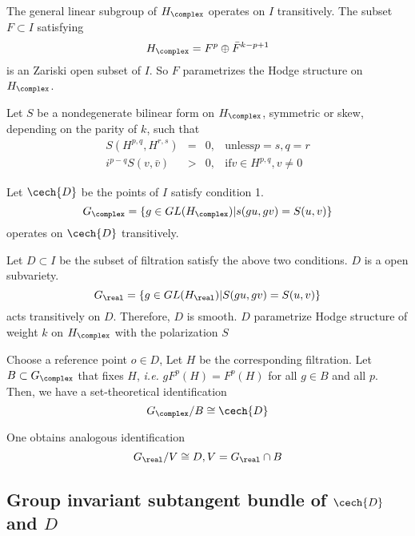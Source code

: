 \documentclass{article}
\begin{document}
The general linear subgroup of $H_{\complex}$ operates on $I$ transitively. 
The subset $F \subset I$ satisfying
\[
    H_{\complex} = F^p\oplus \bar{F}^{k-p+1}
\]
is an Zariski open subset of $I$. So $F$ parametrizes the Hodge structure on $H_{\complex}$.

Let $S$ be a nondegenerate bilinear form on $H_{\complex}$, symmetric or skew, depending
on the parity of $k$, such that 
\begin{align*}
    S(H^{p,q}, H^{r,s}) & = & 0, & \text{unless} p = s, q = r \\
    i^{p-q}S(v, \bar{v})& > & 0, & \text{if} v \in H^{p,q}, v\neq 0
\end{align*}

Let $\cech{D}$ be the points of $I$ satisfy condition 1.
\[
    G_{\complex} = \{g \in GL(H_{\complex}) | s(gu, gv) = S(u, v)\}
\]
operates on $\cech{D}$ transitively. 


Let $D \subset I$ be the subset of filtration satisfy the above two conditions.
$D$ is a open subvariety. 
\[
    G_{\real} = \{g\in GL(H_{\real}) | S(gu, gv) = S(u, v)\}
\]
acts transitively on $D$. Therefore, $D$ is smooth. $D$ parametrize Hodge 
structure of weight $k$ on $H_{\complex}$ with the polarization $S$

Choose a reference point $o \in D$, Let $H$ be the corresponding filtration.
Let $B \subset G_{\complex}$ that fixes $H$, \emph{i.e.} $gF^{p}(H) = F^{p}(H)$
for all $g\in B$ and all $p$. Then, we have a set-theoretical identification
\[
    G_{\complex}/B \cong \cech{D}
\]

One obtains analogous identification
\[
    G_{\real}/V \cong D, V = G_{\real}\cap B
\]

\subsection{Group invariant subtangent bundle of $\cech{D}$ and $D$}
\end{document}
